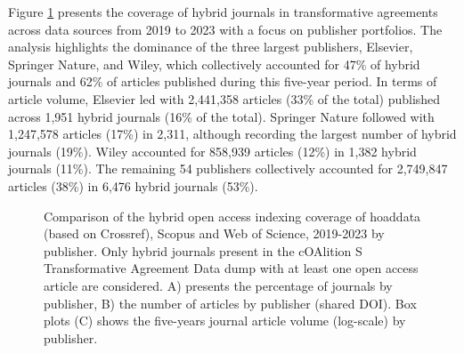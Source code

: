 \documentclass[a4paper,man,floatsintext,longtable,noextraspace,10pt]{apa6}
\begin{document}
Figure \ref{fig-upset_coverage_results_publisher} presents the coverage
of hybrid journals in transformative agreements across data sources from
2019 to 2023 with a focus on publisher portfolios. The analysis
highlights the dominance of the three largest publishers, Elsevier,
Springer Nature, and Wiley, which collectively accounted for 47\% of
hybrid journals and 62\% of articles published during this five-year
period. In terms of article volume, Elsevier led with 2,441,358 articles
(33\% of the total) published across 1,951 hybrid journals (16\% of the
total). Springer Nature followed with 1,247,578 articles (17\%) in
2,311, although recording the largest number of hybrid journals (19\%).
Wiley accounted for 858,939 articles (12\%) in 1,382 hybrid journals
(11\%). The remaining 54 publishers collectively accounted for 2,749,847
articles (38\%) in 6,476 hybrid journals (53\%).

\begin{figure}[ht!]


\caption{\label{fig-upset_coverage_results_publisher}Comparison of the
hybrid open access indexing coverage of hoaddata (based on Crossref),
Scopus and Web of Science, 2019-2023 by publisher. Only hybrid journals
present in the cOAlition S Transformative Agreement Data dump with at
least one open access article are considered. A) presents the percentage
of journals by publisher, B) the number of articles by publisher (shared
DOI). Box plots (C) shows the five-years journal article volume
(log-scale) by publisher.}

\end{figure}%
\end{document}
